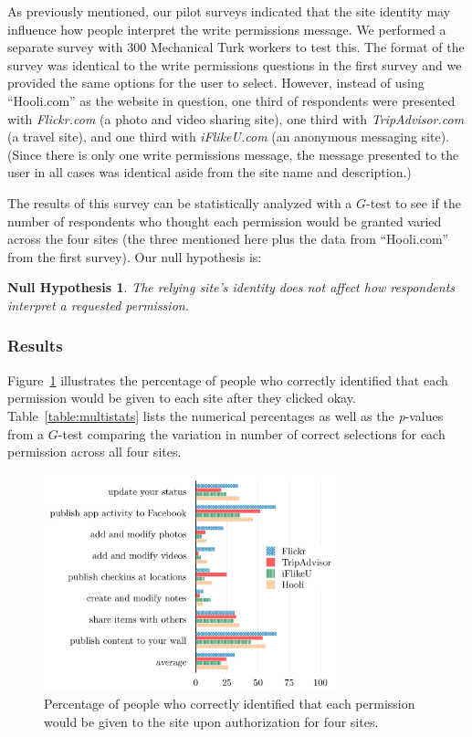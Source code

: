 \documentclass{sig-alternate}
\newtheorem{hypothesis}{Null Hypothesis}
\begin{document}
As previously mentioned, our pilot surveys indicated that the site identity may influence how people interpret the write permissions message. We performed a separate survey with 300 Mechanical Turk workers to test this. The format of the survey was identical to the write permissions questions in the first survey and we provided the same options for the user to select. However, instead of using ``Hooli.com'' as the website in question, one third of respondents were presented with \emph{Flickr.com} (a photo and video sharing site), one third with \emph{TripAdvisor.com} (a travel site), and one third with \emph{iFlikeU.com} (an anonymous messaging site). (Since there is only one write permissions message, the message presented to the user in all cases was identical aside from the site name and description.)

The results of this survey can be statistically analyzed with a $G$-test to see if the number of respondents who thought each permission would be granted varied across the four sites (the three mentioned here plus the data from ``Hooli.com'' from the first survey). Our null hypothesis is: 

\begin{hypothesis}\label{hyp:site_identity}
The relying site's identity does not affect how respondents interpret a requested permission.
\end{hypothesis}

\subsubsection{Results}

Figure~\ref{figure:multipercents} illustrates the percentage of people who correctly identified that each permission would be given to each site after they clicked okay. Table~\ref{table:multistats} lists the numerical percentages as well as the \emph{p}-values from a $G$-test comparing the variation in number of correct selections for each permission across all four sites.

\begin{figure}[tb!]
  \centering
  \includegraphics[width=8.5cm]{multi_percents_cosn}
  \caption{Percentage of people who correctly identified that each permission would be given to the site upon authorization for four sites.}
  \label{figure:multipercents}
\end{figure}
\end{document}
